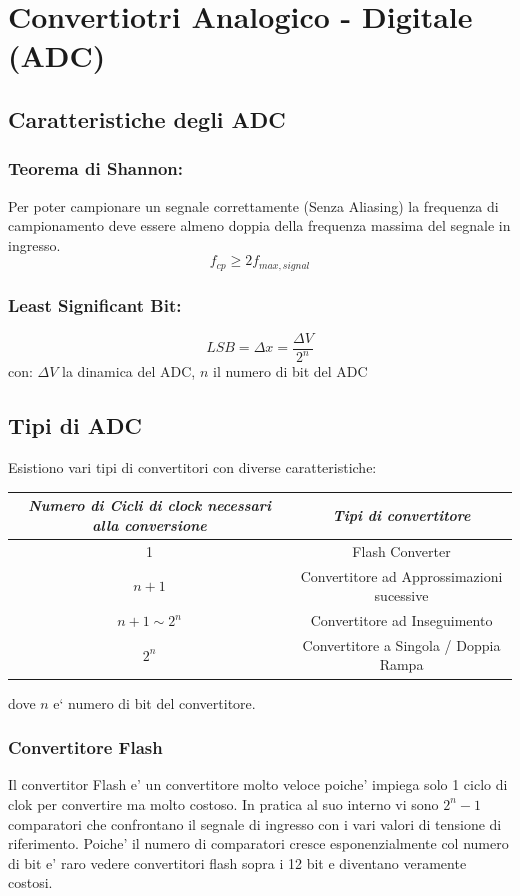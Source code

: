 \documentclass[\main/main.tex]{subfiles}
\begin{document}
\clearpage
\section{Convertiotri Analogico - Digitale (ADC)}
\subsection{Caratteristiche degli ADC}

\subsubsection{Teorema di Shannon:}
Per poter campionare un segnale correttamente (Senza Aliasing) la frequenza di campionamento deve essere almeno doppia della frequenza massima del segnale in ingresso.
\[f_{cp} \ge 2 f_{max,signal}\]

\subsubsection{Least Significant Bit:}
\[LSB = \Delta x = \frac{\Delta V}{2^n} \]
con:
$\Delta V$ la dinamica del ADC,
 $n$ il numero di bit del ADC
\subsection{Tipi di ADC}

 Esistiono vari tipi di convertitori con diverse caratteristiche:
\begin{center}
 \begin{tabular}{| c | c |}
 \hline
 \textit{Numero di Cicli di clock necessari alla conversione} & \textit{Tipi di convertitore}\\
 \hline
 1 & Flash Converter\\
 \hline
 $n+1$ & Convertitore ad Approssimazioni sucessive\\
 \hline
 $n+1 \sim 2^n$ & Convertitore ad Inseguimento\\
 \hline
 $2^n$ & Convertitore a Singola / Doppia Rampa\\
 \hline
 \end{tabular}
\end{center}
dove $n$  e` numero di bit del convertitore.

\subsubsection{Convertitore Flash}
Il convertitor Flash e' un convertitore molto veloce poiche' impiega solo 1 ciclo di clok per convertire ma molto costoso.
In pratica al suo interno vi sono $2^n - 1$ comparatori che confrontano il segnale di ingresso con i vari valori di tensione di riferimento.
Poiche' il numero di comparatori cresce esponenzialmente col numero di bit e' raro vedere convertitori flash sopra i 12 bit e diventano veramente costosi.
\end{document}

